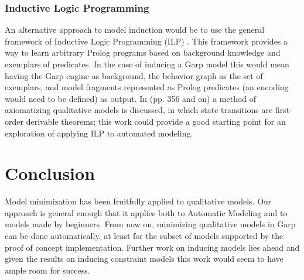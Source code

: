\documentclass{article} %
\begin{document}
\subsubsection{Inductive Logic Programming}

An alternative approach to model induction would be to use the general
framework of Inductive Logic Programming (ILP) \cite{mitchell}. This framework
provides a way to learn arbitrary Prolog programs based on background knowledge
and exemplars of predicates. In the case of inducing a Garp model this would
mean having the Garp engine as background, the behavior graph as the set of
exemplars, and model fragments represented as Prolog predicates (an encoding
would need to be defined) as output. In \cite{kuipers} (pp. 356 and on) a
method of axiomatizing qualitative models is discussed, in which state
transitions are first-order derivable theorems; this work could provide a good
starting point for an exploration of applying ILP to automated modeling.



\section{Conclusion}
\label{sec:conclusion}
Model minimization has been fruitfully applied to qualitative models. Our
approach is general enough that it applies both to Automatic Modeling and to
models made by beginners. From now on, minimizing qualitative models in Garp
can be done automatically, at least for the subset of models supported by the
proof of concept implementation. Further work on inducing models lies ahead
and given the results on inducing constraint models this work would seem to
have ample room for success.
\end{document}

